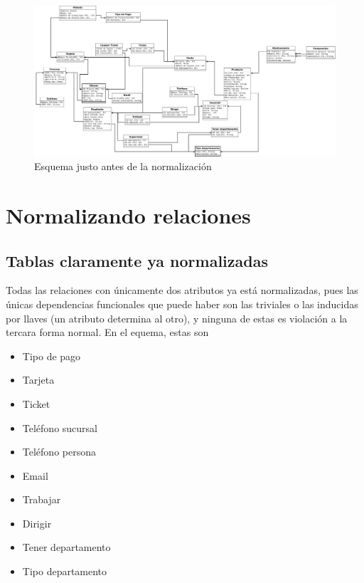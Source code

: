 \documentclass[10pt]{article}
\begin{document}
\begin{figure}[H]
	\centering
	\includegraphics[scale=0.2 ]{practica07.jpeg}
	\caption{Esquema justo antes de la normalización}
	\label{fg:esNN}
\end{figure}

\section{Normalizando relaciones}

\subsection{Tablas claramente ya normalizadas}
Todas las relaciones con únicamente dos atributos ya está normalizadas, pues las
únicas dependencias funcionales que puede haber son las triviales o las inducidas
por llaves (un atributo determina al otro), y ninguna de estas es violación a la
tercara forma normal. En el equema, estas son
\begin{itemize}
	\item Tipo de pago
	\item Tarjeta
	\item Ticket
	\item Teléfono sucursal
	\item Teléfono persona
	\item Email
	\item Trabajar
	\item Dirigir
	\item Tener departamento
	\item Tipo departamento
\end{itemize}
\end{document}
